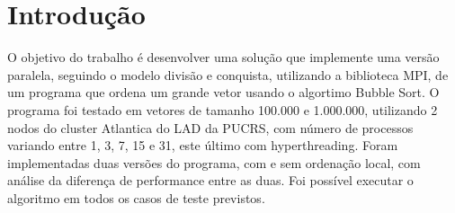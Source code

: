 \section{Introdução}

O objetivo do trabalho é desenvolver uma solução que implemente uma versão paralela, seguindo o modelo divisão e conquista, utilizando a biblioteca MPI, de um programa que ordena um grande vetor usando o algortimo Bubble Sort. O programa foi testado em vetores de tamanho 100.000 e 1.000.000, utilizando 2 nodos do cluster Atlantica do LAD da PUCRS, com número de processos variando entre 1, 3, 7, 15 e 31, este último com hyperthreading. Foram implementadas duas versões do programa, com e sem ordenação local, com análise da diferença de performance entre as duas. Foi possível executar o algoritmo em todos os casos de teste previstos.